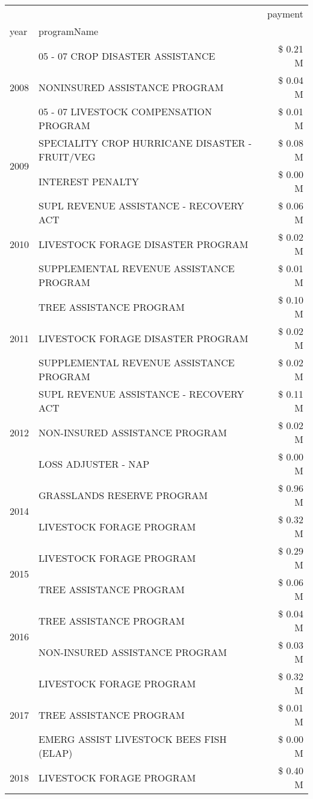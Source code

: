 \begin{tabular}{llr}
\toprule
 &  & payment \\
year & programName &  \\
\midrule
\multirow[t]{3}{*}{2008} & 05 - 07 CROP DISASTER ASSISTANCE & \$ 0.21 M \\
 & NONINSURED ASSISTANCE PROGRAM & \$ 0.04 M \\
 & 05 - 07 LIVESTOCK COMPENSATION PROGRAM & \$ 0.01 M \\
\cline{1-3}
\multirow[t]{2}{*}{2009} & SPECIALITY CROP HURRICANE DISASTER - FRUIT/VEG & \$ 0.08 M \\
 & INTEREST PENALTY & \$ 0.00 M \\
\cline{1-3}
\multirow[t]{3}{*}{2010} & SUPL REVENUE ASSISTANCE - RECOVERY ACT & \$ 0.06 M \\
 & LIVESTOCK FORAGE DISASTER PROGRAM & \$ 0.02 M \\
 & SUPPLEMENTAL REVENUE ASSISTANCE PROGRAM & \$ 0.01 M \\
\cline{1-3}
\multirow[t]{3}{*}{2011} & TREE ASSISTANCE PROGRAM & \$ 0.10 M \\
 & LIVESTOCK FORAGE DISASTER PROGRAM & \$ 0.02 M \\
 & SUPPLEMENTAL REVENUE ASSISTANCE PROGRAM & \$ 0.02 M \\
\cline{1-3}
\multirow[t]{3}{*}{2012} & SUPL REVENUE ASSISTANCE - RECOVERY ACT & \$ 0.11 M \\
 & NON-INSURED ASSISTANCE PROGRAM & \$ 0.02 M \\
 & LOSS ADJUSTER - NAP & \$ 0.00 M \\
\cline{1-3}
\multirow[t]{2}{*}{2014} & GRASSLANDS RESERVE PROGRAM & \$ 0.96 M \\
 & LIVESTOCK FORAGE PROGRAM & \$ 0.32 M \\
\cline{1-3}
\multirow[t]{2}{*}{2015} & LIVESTOCK FORAGE PROGRAM & \$ 0.29 M \\
 & TREE ASSISTANCE PROGRAM & \$ 0.06 M \\
\cline{1-3}
\multirow[t]{2}{*}{2016} & TREE ASSISTANCE PROGRAM & \$ 0.04 M \\
 & NON-INSURED ASSISTANCE PROGRAM & \$ 0.03 M \\
\cline{1-3}
\multirow[t]{3}{*}{2017} & LIVESTOCK FORAGE PROGRAM & \$ 0.32 M \\
 & TREE ASSISTANCE PROGRAM & \$ 0.01 M \\
 & EMERG ASSIST LIVESTOCK BEES FISH (ELAP) & \$ 0.00 M \\
\cline{1-3}
\multirow[t]{3}{*}{2018} & LIVESTOCK FORAGE PROGRAM & \$ 0.40 M \\

\end{tabular}
